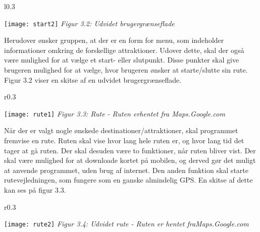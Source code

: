\begin{wrapfigure}{l}{0.3\textwidth}
	\vspace{-50pt}
	\begin{center}
		\texttt{[image: start2]} \newline
		\textit{Figur 3.2: \newline Udvidet brugergrænseflade}\newline
	\end{center}
	\vspace{20pt}
\end{wrapfigure}

Herudover ønsker gruppen, at der er en form for menu, som indeholder informationer omkring de forskellige attraktioner. Udover dette, skal der også være mulighed for at vælge et start- eller slutpunkt. Disse punkter skal give brugeren mulighed for at vælge, hvor brugeren ønsker at starte/slutte sin rute. Figur 3.2 viser en skitse af en udvidet brugergrænseflade.\newline
\newline
\newline
\newline
\newline

\begin{wrapfigure}{r}{0.3\textwidth}
	\vspace{-30pt}
	\begin{center}
		\texttt{[image: rute1]} \newline
		\textit{Figur 3.3: Rute - Ruten er\newline hentet fra Maps.Google.com}\newline
	\end{center}
	\vspace{0pt}
	\vspace{-100pt}
\end{wrapfigure}


Når der er valgt nogle ønskede destinationer/attraktioner, skal programmet fremvise en rute. Ruten skal vise hvor lang hele ruten er, og hvor lang tid det tager at gå ruten. Der skal desuden være to funktioner, når ruten bliver vist. Der skal være mulighed for at downloade kortet på mobilen, og derved gør det muligt at anvende programmet, uden brug af internet. Den anden funktion skal starte rutevejledningen, som fungere som en ganske almindelig GPS. En skitse af dette kan ses på figur 3.3.
\newpage

\begin{wrapfigure}{r}{0.3\textwidth}
	\vspace{-20pt}
	\begin{center}
		\texttt{[image: rute2]} \newline
		\textit{Figur 3.4: Udvidet rute - Ruten er hentet fra\newline Maps.Google.com}\newline
	\end{center}
	\vspace{-20pt}
	\vspace{-10pt}
\end{wrapfigure}

